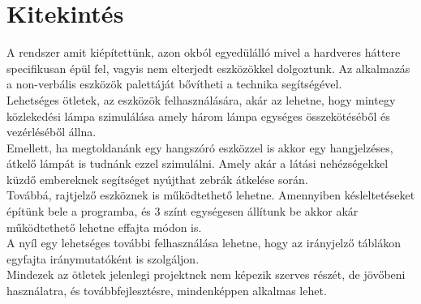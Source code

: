 \documentclass[tocnopagenum]{thesis-ekf}
\theoremstyle{definition}
\theoremstyle{remark}
\begin{document}
	\chapter*{Kitekintés}
	A rendszer amit kiépítettünk, azon okból egyedülálló mivel a hardveres háttere specifikusan épül fel, vagyis nem elterjedt eszközökkel dolgoztunk. Az alkalmazás a non-verbális eszközök palettáját bővítheti a technika segítségével. 
	\\
	Lehetséges ötletek, az eszközök felhasználására, akár az lehetne, hogy mintegy közlekedési lámpa szimulálása amely három lámpa egységes összekötéséből és vezérléséből állna. 
	\\
	Emellett, ha megtoldanánk egy hangszóró eszközzel is akkor egy hangjelzéses, átkelő lámpát is tudnánk ezzel szimulálni. Amely akár a látási nehézségekkel küzdő embereknek segítséget nyújthat zebrák átkelése során.
	\\
	Továbbá, rajtjelző eszköznek is működtethető lehetne. Amennyiben késleltetéseket építünk bele a programba, és 3 színt egységesen állítunk be akkor akár működtethető lehetne effajta módon is. 
	\\
	A nyíl egy lehetséges további felhasználása lehetne, hogy az irányjelző táblákon egyfajta iránymutatóként is szolgáljon.
	\\
	Mindezek az ötletek jelenlegi projektnek nem képezik szerves részét, de jövőbeni használatra, és továbbfejlesztésre, mindenképpen alkalmas lehet.
	
	
	

\end{document}
